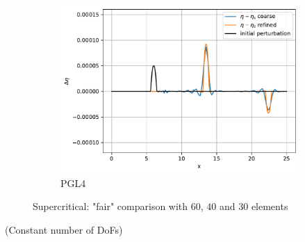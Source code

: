 \documentclass[pt12]{beamer}
\begin{document}
\begin{frame}
\begin{itemize}
\begin{figure}
     \begin{subfigure}[b]{0.3\textwidth}
         \centering
         \includegraphics[width=\textwidth]{alb_bases_WBp3s14jrPGL4.pdf}
         \caption{PGL4}
     \end{subfigure}
        \caption*{Supercritical: "fair" comparison with $60$, $40$ and $30$ elements}
        \label{convergence}
\end{figure}

\centering
(Constant number of DoFs)

\end{itemize}

\end{frame}
\end{document}

